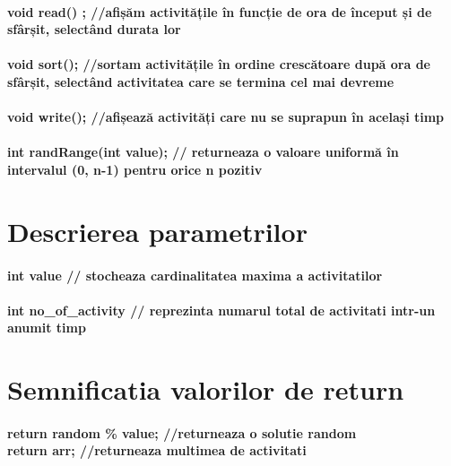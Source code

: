 \documentclass[12pt, a4paper,oneside]{article}
\begin{document}
 \paragraph{
 void read() ;  //afișăm activitățile în funcție de ora de început și de sfârșit, selectând durata lor\\\\
 void sort();   //sortam activitățile în ordine crescătoare după ora de sfârșit, selectând activitatea care se termina cel mai devreme\\\\
 void write(); //afișează activități care nu se suprapun în același timp\\\\
 int randRange(int value); // returneaza o valoare uniformă în intervalul (0, n-1) pentru orice n pozitiv \\
 }
 \section{Descrierea parametrilor \\}
\paragraph{ 
int value // stocheaza cardinalitatea maxima a activitatilor\\\\
int no\_of\_activity // reprezinta numarul total de activitati intr-un anumit timp
}
\section{Semnificatia valorilor de return\\}
\paragraph{
return random \% value; //returneaza o solutie random\\
 return arr;    //returneaza multimea de activitati 
}
\begin{center}
\Huge
{}
\vspace{2em}
\end{center}
\end{document}
